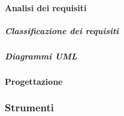 \documentclass[../norme-di-progetto.tex]{subfiles}
\begin{document}
\paragraph{Analisi dei requisiti}
\label{par:analisi dei requisiti}
\subparagraph{Classificazione dei requisiti}
\label{subp:classificazione dei requisiti}
\subparagraph{Diagrammi UML}
\label{subp:diagrammi UML}
\paragraph{Progettazione}
\label{par:progettazione}
\subsubsection{Strumenti}
\label{subs:strumnti}
\end{document}
